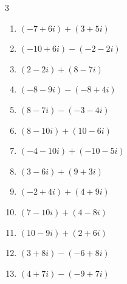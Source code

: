 \begin{multicols}{3}
\begin{enumerate}
  \item $\displaystyle (-7+6i) + (3+5i)$

        \phantom{$\displaystyle =-4+11i$}

  \item $\displaystyle (-10+6i) - (-2-2i)$

        \phantom{$\displaystyle =-8+8i$}

\columnbreak %

  \item $\displaystyle (2-2i) + (8-7i)$

        \phantom{$\displaystyle =10-9i$}

  \item $\displaystyle (-8-9i) - (-8+4i)$

        \phantom{$\displaystyle =-13i$}

  \item $\displaystyle (8-7i) - (-3-4i)$

        \phantom{$\displaystyle =11-3i$}

  \item $\displaystyle (8-10i) + (10-6i)$

        \phantom{$\displaystyle =18-16i$}

  \item $\displaystyle (-4-10i) + (-10-5i)$

        \phantom{$\displaystyle =-14-15i$}

  \item $\displaystyle (3-6i) + (9+3i)$

        \phantom{$\displaystyle =12-3i$}

  \item $\displaystyle (-2+4i) + (4+9i)$

        \phantom{$\displaystyle =2+13i$}

  \item $\displaystyle (7-10i) + (4-8i)$

        \phantom{$\displaystyle =11-18i$}

  \item $\displaystyle (10-9i) + (2+6i)$

        \phantom{$\displaystyle =12-3i$}

  \item $\displaystyle (3+8i) - (-6+8i)$

        \phantom{$\displaystyle =9$}

  \item $\displaystyle (4+7i) - (-9+7i)$


\end{enumerate}
\end{multicols}
